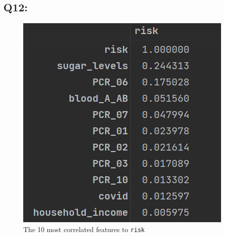 \documentclass{article}
\newcommand{\code}[1]{\texttt{#1}}
\begin{document}
\subsection*{Q12:}
    \begin{figure}[H]
        \centering
        \includegraphics{images/q12.png}
        \caption{The 10 most correlated features to \code{risk}}
    \end{figure}
\end{document}
